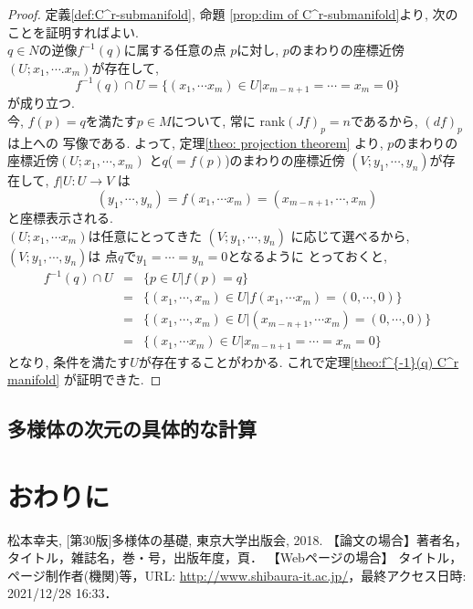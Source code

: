 \documentclass[a4j,12pt]{jarticle}
\theoremstyle{definition}
\begin{document}
\begin{proof}
    定義\ref{def:C^r-submanifold}, 命題
    \ref{prop:dim of C^r-submanifold}より, 
    次のことを証明すればよい.\\ 

    $q\in N$の逆像$f^{-1}(q)$に属する任意の点
    $p$に対し, $p$のまわりの座標近傍
    $(U;x_1,\cdots .x_m)$が存在して, 
    $$f^{-1}(q)\cap U
    =\{(x_1,\cdots x_m)\in U|
    x_{m-n+1}=\cdots =x_m=0\}$$
    が成り立つ. \\

    今, $f(p)=q$を満たす$p\in M$について, 常に
    rank$(Jf)_p=n$であるから, $(df)_p$は上への
    写像である. よって, 定理\ref{theo: projection theorem}
    より, $p$のまわりの座標近傍$(U;x_1,\cdots ,x_m)$
    と$q$($=f(p)$)のまわりの座標近傍
    $(V;y_1,\cdots ,y_n)$が存在して, $f|U:U\to V$
    は
    $$(y_1,\cdots ,y_n)=f(x_1,\cdots x_m)
    =(x_{m-n+1},\cdots ,x_m)$$
    と座標表示される. \\
    $(U;x_1,\cdots x_m)$は任意にとってきた
    $(V;y_1,\cdots ,y_n)$
    に応じて選べるから, $(V;y_1,\cdots ,y_n)$は
    点$q$で$y_1=\cdots =y_n=0$となるように
    とっておくと, 
    \begin{eqnarray*}
        f^{-1}(q)\cap U&=& \{p\in U|f(p)=q\}\\
        &=&\{(x_1,\cdots ,x_m)\in U|f(x_1,\cdots x_m)=(0,\cdots ,0)\}\\
        &=&\{(x_1,\cdots ,x_m)\in U|(x_{m-n+1},\cdots x_m)=(0,\cdots ,0)\}\\
        &=&\{(x_1,\cdots x_m)\in U|x_{m-n+1}=\cdots =x_m=0\}
    \end{eqnarray*}
    となり, 条件を満たす$U$が存在することがわかる. 
    これで定理\ref{theo:f^{-1}(q) C^r manifold}
    が証明できた. 
\end{proof}
\subsection{多様体の次元の具体的な計算}
\newpage
%
\section{おわりに}
\newpage
\begin{thebibliography}{99}
 松本幸夫, [第30版]多様体の基礎, 東京大学出版会, 2018.
【論文の場合】著者名，タイトル，雑誌名，巻・号，出版年度，頁．
【Webページの場合】 タイトル，ページ制作者(機関)等，URL: \url{http://www.shibaura-it.ac.jp/}，最終アクセス日時: 2021/12/28 16:33．
\end{thebibliography}
\end{document}
